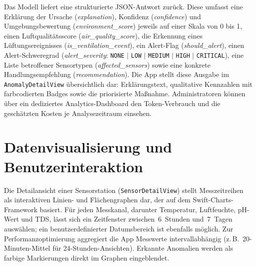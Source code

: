   Das Modell liefert eine strukturierte JSON-Antwort zurück. Diese umfasst
  eine Erklärung der Ursache (\emph{explanation}), Konfidenz (\emph{confidence})
  und Umgebungsbewertung (\emph{environment\_score}) jeweils auf einer Skala
  von 0 bis 1, einen Luftqualitätsscore (\emph{air\_quality\_score}), die Erkennung
  eines Lüftungsereignisses (\emph{is\_ventilation\_event}), ein Alert-Flag
  (\emph{should\_alert}), einen Alert-Schweregrad
  (\emph{alert\_severity}: \texttt{NONE} $|$ \texttt{LOW} $|$ \texttt{MEDIUM}
  $|$ \texttt{HIGH} $|$ \texttt{CRITICAL}), eine Liste betroffener Sensortypen
  (\emph{affected\_sensors}) sowie eine konkrete Handlungsempfehlung
  (\emph{recommendation}).
  Die App stellt diese Ausgabe im \texttt{AnomalyDetailView} übersichtlich dar:
  Erklärungstext, qualitative Kennzahlen mit farbcodierten Badges sowie die
  priorisierte Maßnahme. Administratoren können über ein dediziertes
  Analytics-Dashboard den Token-Verbrauch und die geschätzten Kosten je
  Analysezeitraum einsehen.

      \section*{Datenvisualisierung und Benutzerinteraktion}
                                                            
  Die Detailansicht einer Sensorstation (\texttt{SensorDetailView}) stellt                                                                           
  Messzeitreihen als interaktiven Linien- und Flächengraphen dar, der auf
  dem Swift-Charts-Framework basiert. Für jeden Messkanal, darunter                                                                                 
  Temperatur, Luftfeuchte, pH-Wert und TDS, lässt sich ein Zeitfenster                                                                              
  zwischen~6~Stunden und~7~Tagen auswählen; ein benutzerdefinierter                                                                                  
  Datumsbereich ist ebenfalls möglich. Zur Performanzoptimierung aggregiert                                                                          
  die App Messwerte intervallabhängig (z.\,B.\ 20-Minuten-Mittel für                                                                                 
  24-Stunden-Ansichten). Erkannte Anomalien werden als farbige Markierungen                                                                          
  direkt im Graphen eingeblendet.                                                                                                                    
                                                                                                                                                     
